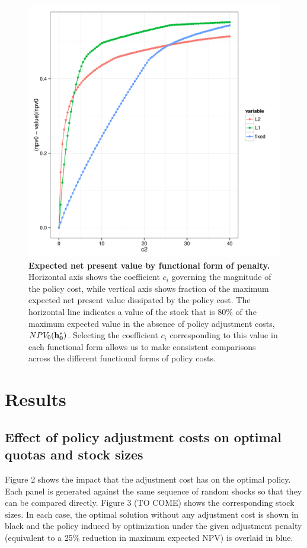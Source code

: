 \documentclass{article}\usepackage{graphicx, color}
\makeatletter
\def\maxwidth{ %
  \ifdim\Gin@nat@width>\linewidth
    \linewidth
  \else
    \Gin@nat@width
  \fi
}
\newenvironment{knitrout}{}{} %
\makeatother
\begin{document}
\begin{figure}
\begin{knitrout}
\color{fgcolor}
\includegraphics[width=\maxwidth]{figure/Figure_1} 

\end{knitrout}


\caption{\textbf{Expected net present value by functional form of penalty.} Horizontal axis shows the coefficient $c_i$ governing the magnitude of the policy cost, while vertical axis shows fraction of the maximum expected net present value dissipated by the policy cost.  The horizontal line indicates a value of the stock that is 80\% of the maximum expected value in the absence of policy adjustment costs, $NPV_0({\bf h_0^*})$. Selecting the coefficient $c_i$ corresponding to this value in each functional form allows us to make consistent comparisons across the different functional forms of policy costs.  }
\end{figure}

\section{Results}
\subsection*{Effect of policy adjustment costs on optimal quotas and stock sizes}
Figure 2 shows the impact that the adjustment cost has on the optimal policy.   Each panel is generated against the same sequence of random shocks so that they can be compared directly. Figure 3 (TO COME) shows the corresponding stock sizes.  In each case, the optimal solution without any adjustment cost is shown in black and the policy induced by optimization under the given adjustment penalty (equivalent to a 25\% reduction in maximum expected NPV) is overlaid in blue.  
\end{document}
